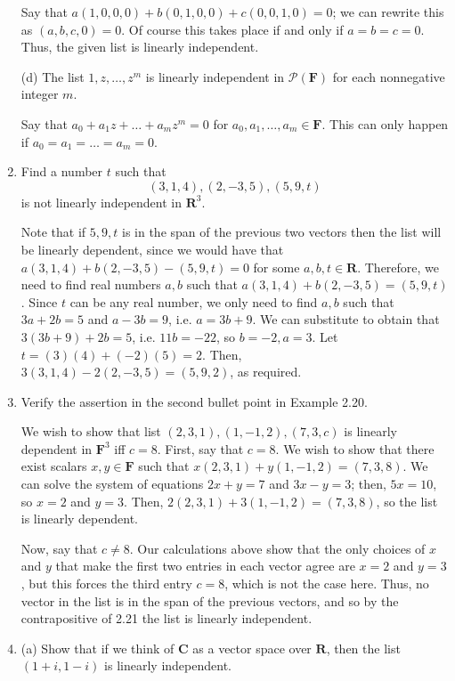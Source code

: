 \documentclass{book}
\begin{document}
\begin{enumerate}
Say that \(a(1,0,0,0)+b(0,1,0,0)+c(0,0,1,0)=0\); we can rewrite this as \((a,b,c,0)=0\).  Of course this takes place if and only if \(a=b=c=0\). Thus, the given list is linearly independent.

(d) The list \(1,z,\dots,z^m\) is linearly independent in \(\mathcal{P}(\textbf{F})\) for each nonnegative integer \(m\).

Say that \(a_0+a_1z+\dots+a_mz^m=0\) for \(a_0,a_1,\dots,a_m \in \textbf{F}\).  This can only happen if \(a_0=a_1=\dots=a_m=0\).

\item Find a number \(t\) such that \[(3,1,4),(2,-3,5),(5,9,t)\] is not linearly independent in \(\textbf{R}^3\).

Note that if \(5,9,t\) is in the span of the previous two vectors then the list will be linearly dependent, since we would have that \(a(3,1,4)+b(2,-3,5)-(5,9,t)=0\) for some \(a,b,t \in \textbf{R}\).  Therefore, we need to find real numbers \(a,b\) such that \(a(3,1,4)+b(2,-3,5)=(5,9,t)\).  Since \(t\) can be any real number, we only need to find \(a,b\) such that \(3a+2b=5\) and \(a-3b=9\), i.e. \(a=3b+9\).  We can substitute to obtain that \(3(3b+9)+2b=5\), i.e. \(11b=-22\), so \(b=-2, a=3\).  Let \(t=(3)(4)+(-2)(5)=2\).  Then, \(3(3,1,4)-2(2,-3,5)=(5,9,2)\), as required.

\item Verify the assertion in the second bullet point in Example 2.20.

We wish to show that list \((2,3,1),(1,-1,2),(7,3,c)\) is linearly dependent in \(\textbf{F}^3\) iff \(c=8\).  First, say that \(c=8\).  We wish to show that there exist scalars \(x,y \in \textbf{F}\) such that \(x(2,3,1)+y(1,-1,2)=(7,3,8)\).  We can solve the system of equations \(2x+y=7\) and \(3x-y=3\); then, \(5x=10\), so \(x=2\) and \(y=3\).  Then, \(2(2,3,1)+3(1,-1,2)=(7,3,8)\), so the list is linearly dependent.

Now, say that \(c \neq 8\).  Our calculations above show that the only choices of \(x\) and \(y\) that make the first two entries in each vector agree are \(x=2\) and \(y=3\), but this forces the third entry \(c=8\), which is not the case here.  Thus, no vector in the list is in the span of the previous vectors, and so by the contrapositive of 2.21 the list is linearly independent.

\item (a) Show that if we think of \(\textbf{C}\) as a vector space over \(\textbf{R}\), then the list \((1+i,1-i)\) is linearly independent.


\end{enumerate}
\end{document}
